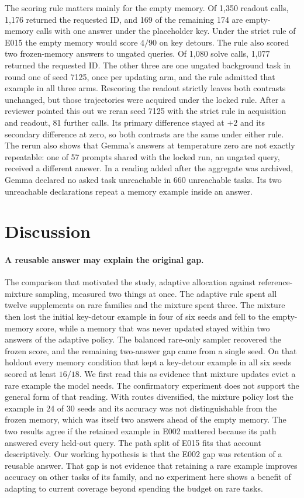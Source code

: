 \documentclass[11pt]{article}
\begin{document}
The scoring rule matters mainly for the empty memory. Of 1,350 readout
calls, 1,176 returned the requested ID, and 169 of the remaining 174
are empty-memory calls with one answer under the placeholder key.
Under the strict rule of E015 the empty memory would score $4/90$ on
key detours. The rule also scored two frozen-memory answers to ungated
queries. Of 1,080 solve calls, 1,077 returned the requested ID. The
other three are one ungated background task in round one of seed 7125,
once per updating arm, and the rule admitted that example in all three
arms. Rescoring the readout strictly leaves both contrasts unchanged,
but those trajectories were acquired under the locked rule. After a
reviewer pointed this out we reran seed 7125 with the strict rule in
acquisition and readout, 81 further calls. Its primary difference
stayed at $+2$ and its secondary difference at zero, so both contrasts
are the same under either rule. The rerun also shows that Gemma's
answers at temperature zero are not exactly repeatable: one of 57
prompts shared with the locked run, an ungated query, received a
different answer. In a reading added after the aggregate was archived, Gemma
declared no asked task unreachable in 660 unreachable tasks. Its two
unreachable declarations repeat a memory example inside an answer.

\section{Discussion}

\paragraph{A reusable answer may explain the original gap.} The
comparison that motivated the study, adaptive allocation against
reference-mixture sampling, measured two things at once. The adaptive
rule spent all twelve supplements on rare families and the mixture
spent three. The mixture then lost the initial key-detour example in
four of six seeds and fell to the empty-memory score, while a memory
that was never updated stayed within two answers of the adaptive
policy. The balanced rare-only sampler recovered the frozen score, and
the remaining two-answer gap came from a single seed. On that holdout
every memory condition that kept a key-detour example in all six seeds
scored at least $16/18$. We first read this as evidence that mixture
updates evict a rare example the model needs. The confirmatory
experiment does not support the general form of that reading. With
routes diversified, the mixture policy lost the example in 24 of 30
seeds and its accuracy was not distinguishable from the frozen memory,
which was itself two answers ahead of the empty memory. The two results
agree if the retained example in E002 mattered because its path
answered every held-out query. The path split of E015 fits that account
descriptively. Our working hypothesis is that the E002 gap was
retention of a reusable answer. That gap is not evidence that retaining a
rare example improves accuracy on other tasks of its family, and
no experiment here shows a benefit of adapting to current coverage
beyond spending the budget on rare tasks.
\end{document}

